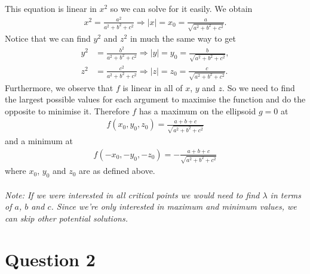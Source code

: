 \documentclass{article}
\begin{document}
This equation is linear in $x^2$ so we can solve for it easily. We obtain
\begin{align*}
	x^2=\frac{a^2}{a^2+b^2+c^2} \Rightarrow |x|=x_0=\frac{a}{\sqrt{a^2+b^2+c^2}}.
\end{align*}
Notice that we can find $y^2$ and $z^2$ in much the same way to get
\begin{align*}
	y^2 & =\frac{b^2}{a^2+b^2+c^2}\Rightarrow |y|=y_0=\frac{b}{\sqrt{a^2+b^2+c^2}}, \\
	z^2 & =\frac{c^2}{a^2+b^2+c^2}\Rightarrow |z|=z_0=\frac{c}{\sqrt{a^2+b^2+c^2}}.
\end{align*}
Furthermore, we observe that $f$ is linear in all of $x$, $y$ and $z$.
So we need to find the largest possible values for each argument to maximise
the function and do the opposite to minimise it. Therefore $f$ has a maximum
on the ellipsoid $g=0$ at
\begin{align*}
	f(x_0,y_0,z_0) = \frac{a+b+c}{\sqrt{a^2+b^2+c^2}}
\end{align*}
and a minimum at
\begin{align*}
	f(-x_0, -y_0, -z_0) = -\frac{a+b+c}{\sqrt{a^2+b^2+c^2}}
\end{align*}
where $x_0$, $y_0$ and $z_0$ are as defined above.\\\\
\emph{Note: If we were interested in all critical points we would need to find
	$\lambda$ in terms of $a$, $b$ and $c$. Since we're only interested in maximum
	and minimum values, we can skip other potential solutions.}


\section*{Question 2}
\end{document}
